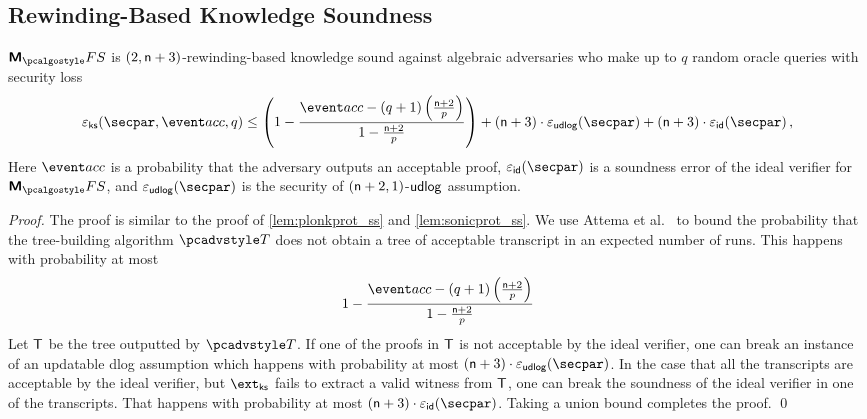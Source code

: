 \subsection{Rewinding-Based Knowledge Soundness}
\begin{lemma}
	\label{lem:marlinprot_ss}
	$\marlinprotfs$ is $(2, \mathsf{n} + 3)$-rewinding-based knowledge sound against algebraic adversaries who make up to $q$ random oracle queries with security loss 
	\[
	\epscss(\secpar,\accProb, q) \leq \left(1 - \frac{\accProb - (q + 1) \left( \frac{\multconstr + 2}{p}\right)}{1 - \frac{\multconstr + 2}{p}}\right) + (\multconstr + 3)\cdot\epsudlog (\secpar) + (\multconstr + 3) \cdot \epsid (\secpar)\,,
	\]
	Here $\accProb$ is a probability that the adversary outputs an acceptable proof, $\epsid(\secpar)$ is a soundness error of the ideal verifier for $\marlinprotfs$, and $\epsudlog(\secpar)$ is the security of $(\mathsf{n} + 2, 1)$-$\mathsf{udlog}$ assumption.
\end{lemma}
\begin{proof}
The proof is similar to the proof of \cref{lem:plonkprot_ss} and \cref{lem:sonicprot_ss}. 
We use Attema et al.~\cite[Proposition 2]{EPRINT:AttFehKlo21} to bound the probability that the tree-building algorithm $\tdv$ does not obtain a tree of acceptable transcript in an expected number of runs. This happens with probability at most
\[
1 - \frac{\accProb - (q + 1) \left(\frac{ \noofc + 2}{p} \right)}{1 - \frac{\noofc + 2}{p}}
\]
Let $\mathsf{T}$ be the tree outputted by $\tdv$. If one of the proofs in $\mathsf{T}$ is not acceptable by the ideal verifier, one can break an instance of an updatable dlog assumption which happens with probability at most $(\noofc + 3)  \cdot \epsudlog (\secpar)$. In the case that all the transcripts are acceptable by the ideal verifier, but $\extss$ fails to extract a valid witness from $\mathsf{T}$, one can break the soundness of the ideal verifier in one of the transcripts. That happens with probability at most $(\noofc + 3) \cdot \epsid (\secpar)$. Taking a union bound completes the proof.
\qed
\end{proof}


